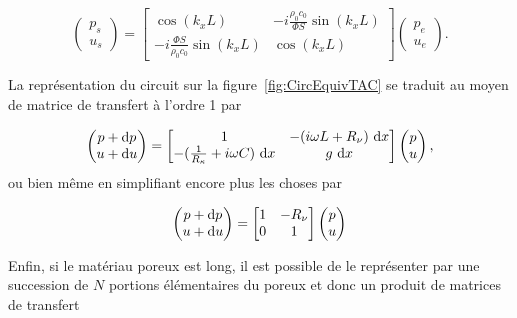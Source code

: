 \begin{equation}
\begin{pmatrix}
p_s\\
u_s
\end{pmatrix} = \begin{bmatrix}
\cos(k_x L) & -i\frac{\rho_0 c_0}{\Phi S}\sin(k_x L)\\
-i\frac{\Phi S}{\rho_0 c_0}\sin(k_x L) & \cos(k_x L)
\end{bmatrix}
\begin{pmatrix}
p_e\\
u_e
\end{pmatrix}.\label{eq:Tmatrix_poreux}
\end{equation}


La représentation du circuit sur la figure~\ref{fig:CircEquivTAC} se traduit au moyen de matrice de transfert à l'ordre 1 par 


\begin{equation}
	\begin{pmatrix}
		p + \mathrm{d} p\\
		u + \mathrm{d} u
	\end{pmatrix} = \begin{bmatrix}
	1 & -(i\omega L + R_\nu)~\mathrm{d} x  \\
	-(\frac{1}{R_\kappa} + i \omega C)~\mathrm{d} x & g~\mathrm{d} x \end{bmatrix} \begin{pmatrix}
	p \\
	u
	\end{pmatrix}, \label{eq:TMatrix_NoyauTA}
\end{equation}
ou bien même en simplifiant encore plus les choses par

\begin{equation}
    \begin{pmatrix}
        p + \mathrm{d} p \\
        u + \mathrm{d} u
    \end{pmatrix} = \begin{bmatrix}
    1 & -R_\nu \\
    0 & 1
    \end{bmatrix}\begin{pmatrix}
        p \\
        u
    \end{pmatrix}
    \label{eq:Tmatrix_NoyauTA_simplifie}
\end{equation}

Enfin, si le matériau poreux est long, il est possible de le représenter par une succession de $N$ portions élémentaires du poreux et donc un produit de matrices de transfert

